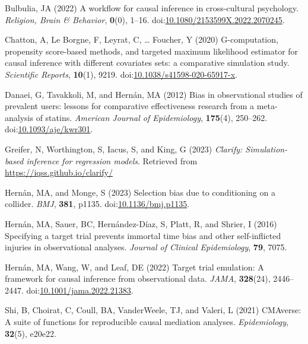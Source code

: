 \documentclass[
  singlecolumn]{article}
\newlength{\cslhangindent}
\newlength{\cslentryspacingunit} %
\newenvironment{CSLReferences}[2] %
 {%
  \setlength{\parindent}{0pt}
  \ifodd #1
  \let\oldpar\par
  \def\par{\hangindent=\cslhangindent\oldpar}
  \fi
  \setlength{\parskip}{#2\cslentryspacingunit}
 }%
 {}
\begin{document}
\hypertarget{refs}{}
\begin{CSLReferences}{1}{0}
\leavevmode{}%
Bulbulia, JA (2022) A workflow for causal inference in cross-cultural
psychology. \emph{Religion, Brain \& Behavior}, \textbf{0}(0), 1--16.
doi:\href{https://doi.org/10.1080/2153599X.2022.2070245}{10.1080/2153599X.2022.2070245}.

\leavevmode{}%
Chatton, A, Le Borgne, F, Leyrat, C, \ldots{} Foucher, Y (2020)
G-computation, propensity score-based methods, and targeted maximum
likelihood estimator for causal inference with different covariates
sets: a comparative simulation study. \emph{Scientific Reports},
\textbf{10}(1), 9219.
doi:\href{https://doi.org/10.1038/s41598-020-65917-x}{10.1038/s41598-020-65917-x}.

\leavevmode{}%
Danaei, G, Tavakkoli, M, and Hernán, MA (2012) Bias in observational
studies of prevalent users: lessons for comparative effectiveness
research from a meta-analysis of statins. \emph{American Journal of
Epidemiology}, \textbf{175}(4), 250--262.
doi:\href{https://doi.org/10.1093/aje/kwr301}{10.1093/aje/kwr301}.

\leavevmode{}%
Greifer, N, Worthington, S, Iacus, S, and King, G (2023) \emph{Clarify:
Simulation-based inference for regression models}. Retrieved from
\url{https://iqss.github.io/clarify/}

\leavevmode{}%
Hernán, MA, and Monge, S (2023) Selection bias due to conditioning on a
collider. \emph{BMJ}, \textbf{381}, p1135.
doi:\href{https://doi.org/10.1136/bmj.p1135}{10.1136/bmj.p1135}.

\leavevmode{}%
Hernán, MA, Sauer, BC, Hernández-Díaz, S, Platt, R, and Shrier, I (2016)
Specifying a target trial prevents immortal time bias and other
self-inflicted injuries in observational analyses. \emph{Journal of
Clinical Epidemiology}, \textbf{79}, 7075.

\leavevmode{}%
Hernán, MA, Wang, W, and Leaf, DE (2022) Target trial emulation: A
framework for causal inference from observational data. \emph{JAMA},
\textbf{328}(24), 2446--2447.
doi:\href{https://doi.org/10.1001/jama.2022.21383}{10.1001/jama.2022.21383}.

\leavevmode{}%
Shi, B, Choirat, C, Coull, BA, VanderWeele, TJ, and Valeri, L (2021)
CMAverse: A suite of functions for reproducible causal mediation
analyses. \emph{Epidemiology}, \textbf{32}(5), e20e22.


\end{CSLReferences}
\end{document}
